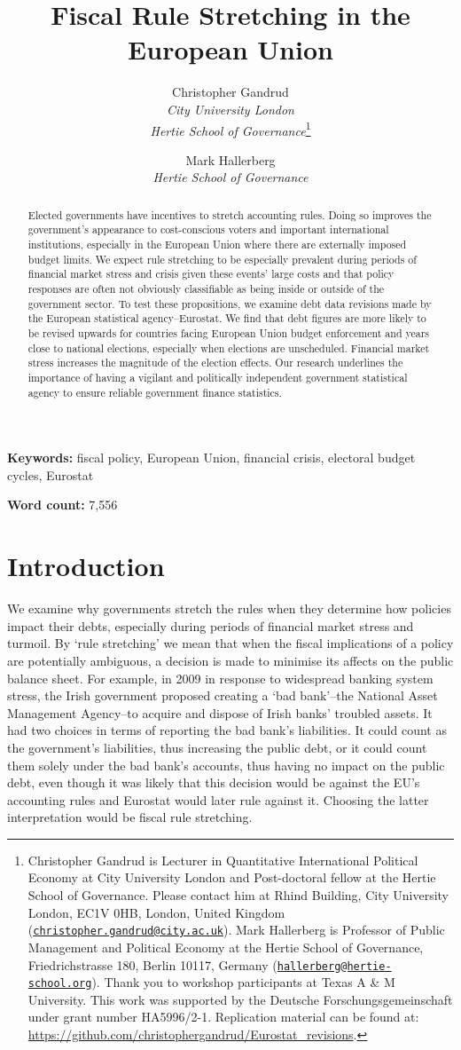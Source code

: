 \documentclass[]{article}
\title{Fiscal Rule Stretching in the European Union}
\author{Christopher Gandrud \\ \emph{City University London} \\ \emph{Hertie School of Governance}\footnote{Christopher Gandrud is Lecturer in Quantitative International Political Economy at City University London and Post-doctoral fellow at the Hertie School of Governance. Please contact him at Rhind Building, City University London, EC1V 0HB, London, United Kingdom
(\href{mailto:christopher.gandrud@city.ac.uk}{\nolinkurl{christopher.gandrud@city.ac.uk}}). Mark Hallerberg is Professor of Public Management and Political Economy at the Hertie School of Governance, Friedrichstrasse 180, Berlin 10117, Germany (\href{mailto:hallerberg@hertie-school.org}{\nolinkurl{hallerberg@hertie-school.org}}). Thank you to workshop participants at Texas A \& M University. This work was supported by the Deutsche Forschungsgemeinschaft under grant number HA5996/2-1. Replication material can be found at: \url{https://github.com/christophergandrud/Eurostat_revisions}.}
\and
Mark Hallerberg \\ \emph{Hertie School of Governance}}
\begin{document}
\maketitle


\begin{abstract}
Elected governments have incentives to stretch accounting rules. Doing so improves the government’s appearance to cost-conscious voters and important international institutions, especially in the European Union where there are externally imposed budget limits. We expect rule stretching to be especially prevalent during periods of financial market stress and crisis given these events' large costs and that policy responses are often not obviously classifiable as being inside or outside of the government sector. To test these propositions, we examine debt data revisions made by the European statistical agency--Eurostat. We find that debt figures are more likely to be revised upwards for countries facing European Union budget enforcement and years close to national elections, especially when elections are unscheduled. Financial market stress increases the magnitude of the election effects. Our research underlines the importance of having a vigilant and politically independent government statistical agency to ensure reliable government finance statistics.
\end{abstract}


\textbf{Keywords:} fiscal policy, European Union, financial crisis, electoral budget cycles, Eurostat

\textbf{Word count:} 7,556

\pagebreak

\section{Introduction}

We examine why governments stretch the rules when they determine how policies impact their debts, especially during periods of financial market stress and turmoil. By `rule stretching' we mean that when the fiscal implications of a policy are potentially ambiguous, a decision is made to minimise its affects on the public balance sheet. For example, in 2009 in response to widespread banking system stress, the Irish government proposed creating a `bad bank'--the National Asset Management Agency--to acquire and dispose of Irish banks' troubled assets. It had two choices in terms of reporting the bad bank's liabilities. It could count as the government's liabilities, thus increasing the public debt, or it could count them solely under the bad bank's accounts, thus having no impact on the public debt, even though it was likely that this decision would be against the EU's accounting rules and Eurostat would later rule against it. Choosing the latter interpretation would be fiscal rule stretching.
\end{document}
